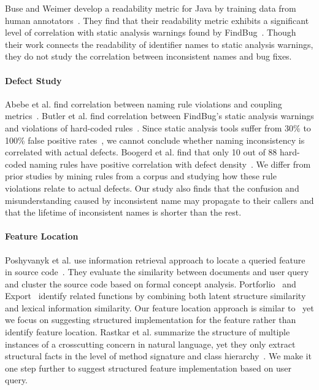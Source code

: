Buse and Weimer develop a readability metric for Java by training data from human annotators~\cite{buse:readability}. They find that their readability metric exhibits a significant level of correlation with static analysis warnings found by FindBug~\cite{FindBug:OOPSLA06}. Though their work connects the readability of identifier names to  static analysis warnings, they do not study the correlation between inconsistent names and bug fixes. 

\paragraph{Defect Study}  Abebe et al.\/ find correlation between naming rule violations and  coupling metrics~\cite{abebe:wcre12,ckmetrics:oopsla91}. Butler et al.\/ find correlation between FindBug's static analysis warnings and violations of hard-coded rules~\cite{FindBug:OOPSLA06,butler:csmr10}. Since static analysis tools suffer from 30\% to 100\% false positive rates~\cite{kremenekWarn:fse04}, we cannot conclude whether naming inconsistency is correlated with actual defects. Boogerd et al.\/ find that only 10 out of 88 hard-coded naming rules have positive correlation with defect density~\cite{boogerd:icsm08}. We differ from prior studies by mining rules from a corpus and studying how these rule violations relate to actual defects. Our study also finds that the confusion and misunderstanding caused by inconsistent name may propagate to their callers and that the lifetime of inconsistent names is shorter than the rest. 

 
\paragraph{Feature Location} Poshyvanyk et al. \/ use information retrieval approach to locate a queried feature in source code~\cite{Denys:FCA12}. They  evaluate the similarity between documents and user query and cluster the source code based on formal concept analysis.  Portforlio~\cite{Portfolio:DenysICSE11} and Export~\cite{Export:DenysASE13} identify related functions by combining both latent structure similarity and lexical information similarity. Our feature location approach is similar to~\cite{Portfolio:DenysICSE11} yet we focus on suggesting structured implementation for the feature rather than identify feature location.
Rastkar et al. \/ summarize the structure of multiple instances of a crosscutting concern in natural language, yet they only extract structural facts in the level of method signature and class hierarchy~\cite{Murphy:nlConcern11}. We make it one step further to suggest structured feature implementation based on  user query.

